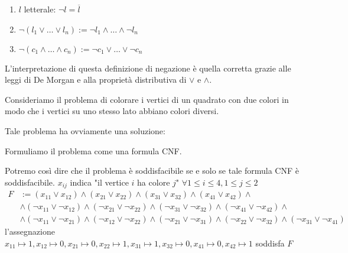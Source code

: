 \documentclass[10pt,a4paper,twoside]{book}
\begin{document}
\begin{definition}
    \begin{enumerate}
        \item $l$ letterale: $\neg l = \overline{l}$
        \item $\neg (l_1 \lor \ldots \lor l_n) := \neg l_1 \land \ldots \land \neg l_n$
        \item $\neg (c_1 \land \ldots \land c_n) := \neg c_1 \lor \ldots \lor \neg c_n$
    \end{enumerate}
\end{definition}
L'interpretazione di questa definizione di negazione è quella corretta grazie alle leggi di De Morgan e alla proprietà distributiva di $\lor$ e $\land$.
\begin{example}
    Consideriamo il problema di colorare i vertici di un quadrato con due colori in modo che i vertici su uno stesso lato abbiano colori diversi.

    Tale problema ha ovviamente una soluzione:
    \begin{center}
    \end{center}
    Formuliamo il problema come una formula CNF.

    Potremo così dire che il problema è soddisfacibile se e solo se tale formula CNF è soddisfacibile. $x_{ij}$ indica "il vertice $i$ ha colore $j$" $\forall 1 \leq i \leq 4, 1 \leq j \leq 2$
    \begin{align*}
        F & := (x_{11} \lor x_{12}) \land (x_{21} \lor x_{22}) \land (x_{31} \lor x_{32}) \land (x_{41} \lor x_{42}) \land                                                                              \\
          & \land (\neg x_{11} \lor \neg x_{12}) \land ( \neg x_{21} \lor \neg x_{22}) \land ( \neg x_{31} \lor \neg x_{32}) \land ( \neg x_{41} \lor \neg x_{42}) \land                                \\
          & \land (\neg x_{11} \lor \neg x_{21}) \land ( \neg x_{12} \lor \neg x_{22}) \land ( \neg x_{21} \lor \neg x_{31}) \land ( \neg x_{22} \lor \neg x_{32}) \land (\neg x_{31} \lor \neg x_{41})
    \end{align*}
    l'assegnazione $x_{11} \mapsto 1, x_{12} \mapsto 0, x_{21} \mapsto 0, x_{22} \mapsto 1, x_{31} \mapsto 1, x_{32} \mapsto 0, x_{41} \mapsto 0, x_{42} \mapsto 1$ soddisfa $F$
\end{example}
\end{document}
